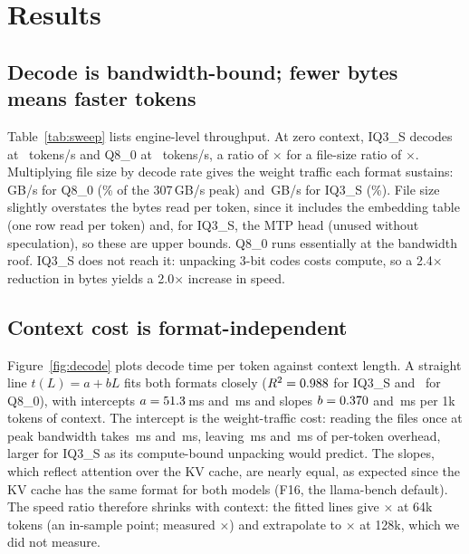 \documentclass[11pt]{article}
\begin{document}
\section{Results}
\label{sec:results}

\subsection{Decode is bandwidth-bound; fewer bytes means faster tokens}

Table~\ref{tab:sweep} lists engine-level throughput. At zero context, IQ3\_S decodes at
\IQtgZero\ tokens/s and Q8\_0 at \QEtgZero\ tokens/s, a ratio of \tgRatioZero$\times$ for a
file-size ratio of \sizeRatio$\times$. Multiplying file size by decode rate gives the
weight traffic each format sustains: \QEbw\,GB/s for Q8\_0 (\QEbwPct\% of the 307\,GB/s peak)
and \IQbw\,GB/s for IQ3\_S (\IQbwPct\%). File size slightly overstates the bytes read per
token, since it includes the embedding table (one row read per token) and, for IQ3\_S, the
MTP head (unused without speculation), so these are upper bounds. Q8\_0 runs essentially at
the bandwidth roof. IQ3\_S does not reach it: unpacking 3-bit codes costs compute, so a
2.4$\times$ reduction in bytes yields a 2.0$\times$ increase in speed.

\begin{table}[t]
  \centering
  \caption{Engine throughput (llama-bench, tokens/s, mean and standard deviation over five
  repetitions) as a function of the number of tokens already in the context.}
  \label{tab:sweep}
  \small
  
\end{table}

\subsection{Context cost is format-independent}
\label{sec:context}

Figure~\ref{fig:decode} plots decode time per token against context length. A straight line
$t(L) = a + bL$ fits both formats closely ($R^2 = 0.988$ for IQ3\_S and \QEfitR\ for
Q8\_0), with intercepts $a = 51.3$\,ms and \QEfitA\,ms and slopes $b = 0.370$ and
\QEfitB\,ms per 1k tokens of context. The intercept is the weight-traffic cost: reading
the files once at peak bandwidth takes \IQroofMs\,ms and \QEroofMs\,ms, leaving
\IQoverMs\,ms and \QEoverMs\,ms of per-token overhead, larger for IQ3\_S as its
compute-bound unpacking would predict. The slopes, which reflect attention over the KV cache, are
nearly equal, as expected since the KV cache has the same format for both models (F16, the
llama-bench default). The speed ratio therefore shrinks with context: the fitted lines give
\ratioPredLong$\times$ at 64k tokens (an in-sample point; measured \tgRatioLong$\times$) and
extrapolate to \ratioPredMax$\times$ at 128k, which we did not measure.
\end{document}
